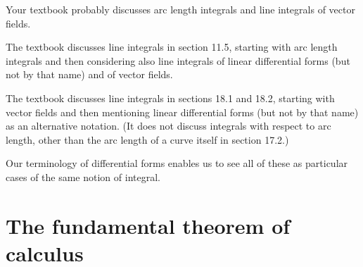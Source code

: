 \documentclass[12pt]{amsart}
\begin{document}
\begin{notextbook}Your textbook probably discusses arc length integrals and line integrals of vector fields.\end{notextbook}
\begin{stewart}The textbook discusses line integrals in section 11.5, starting with arc length integrals and then considering also line integrals of linear differential forms (but not by that name) and of vector fields.\end{stewart}
\begin{hugheshallett}The textbook discusses line integrals in sections 18.1 and 18.2, starting with vector fields and then mentioning linear differential forms (but not by that name) as an alternative notation.
(It does not discuss integrals with respect to arc length, other than the arc length of a curve itself in section 17.2.)\end{hugheshallett}
Our terminology of differential forms enables us to see all of these as particular cases of the same notion of integral.

\section{The fundamental theorem of calculus}
\label{sec:lineintegral-ftc}
\end{document}
